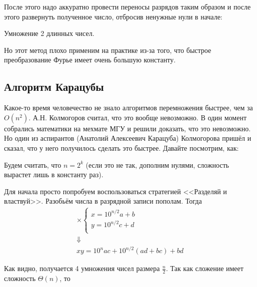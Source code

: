 \documentclass[a4paper, 12pt]{article}
\begin{document}
После этого надо аккуратно провести переносы разрядов таким образом и после этого
развернуть полученное число, отбросив ненужные нули в начале:

\begin{algorithm}
  \caption{Умножение 2 длинных чисел.}
  \begin{algorithmic}[1]
     
      \EndFor
    \EndFunction
  \end{algorithmic}
\end{algorithm}

Но этот метод плохо применим на практике из-за того, что быстрое преобразование
Фурье имеет очень большую константу.

\subsection{Алгоритм Карацубы}

Какое-то время человечество не знало алгоритмов перемножения быстрее, чем за
$O(n^2)$. А.Н. Колмогоров считал, что это вообще невозможно. В один момент
собрались математики на мехмате МГУ и решили доказать, что это невозможно. Но
один из аспирантов (Анатолий Алексеевич Карацуба) Колмогорова пришёл и сказал, что у него получилось сделать
это быстрее. Давайте посмотрим, как:

Будем считать, что $n = 2^k$ (если это не так, дополним нулями, сложность вырастет лишь в константу раз).

Для начала просто попробуем воспользоваться стратегией <<Разделяй и властвуй>>. Разобьём числа в 
разрядной записи пополам. Тогда
\[\begin{array}{c}
\times \begin{cases}
x = 10^{n/2}a + b\\
y = 10^{n/2}c + d\\
\end{cases} \\
\Downarrow\\
xy = 10^{n}ac + 10^{n/2}(ad+bc)+bd
\end{array}\]

Как видно, получается 4 умножения чисел размера $\frac{n}{2}$. Так как сложение имеет сложность $\Theta(n)$, то
\end{document}
